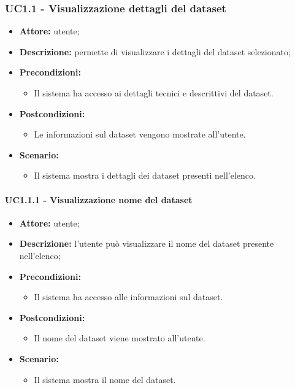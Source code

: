 \subsubsection{UC1.1 - Visualizzazione dettagli del dataset}
\begin{itemize}
    \item \textbf{Attore:} utente;
    \item \textbf{Descrizione:} permette di visualizzare i dettagli del dataset selezionato;
    \item \textbf{Precondizioni:}
    \begin{itemize}
        \item Il sistema ha accesso ai dettagli tecnici e descrittivi del dataset.
    \end{itemize}
    \item \textbf{Postcondizioni:}
    \begin{itemize}
        \item Le informazioni sul dataset vengono mostrate all'utente.
    \end{itemize}
    \item \textbf{Scenario:}
    \begin{itemize}
        \item Il sistema mostra i dettagli dei dataset presenti nell'elenco.
    \end{itemize}
\end{itemize}
\paragraph{UC1.1.1 - Visualizzazione nome del dataset}
\begin{itemize}
    \item \textbf{Attore:} utente;
    \item \textbf{Descrizione:} l'utente può visualizzare il nome del dataset presente nell'elenco;
    \item \textbf{Precondizioni:}
    \begin{itemize}
        \item Il sistema ha accesso alle informazioni sul dataset.
    \end{itemize}
    \item \textbf{Postcondizioni:}
    \begin{itemize}
        \item Il nome del dataset viene mostrato all'utente.
    \end{itemize}
    \item \textbf{Scenario:}
    \begin{itemize}
        \item Il sistema mostra il nome del dataset.
    \end{itemize}
\end{itemize}
